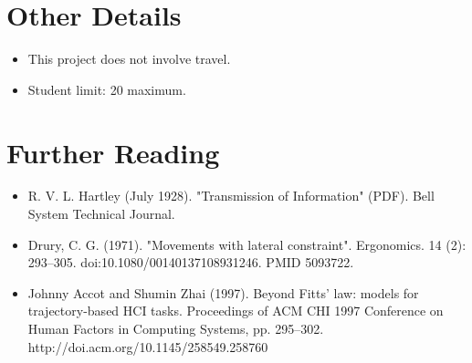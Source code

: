 \documentclass	[a4paper,11pt, hidelinks]{article}
\theoremstyle	{definition}
\begin{document}
\section{Other Details}
\begin{itemize}
  \item This project does not involve travel.
  \item Student limit: 20 maximum.
\end{itemize}

\section{Further Reading}
\begin{itemize}
	\item R. V. L. Hartley (July 1928). "Transmission of Information" (PDF). Bell System Technical Journal.
	\item Drury, C. G. (1971). "Movements with lateral constraint". Ergonomics. 14 (2): 293–305. doi:10.1080/00140137108931246. PMID 5093722.
	\item Johnny Accot and Shumin Zhai (1997). Beyond Fitts' law: models for trajectory-based HCI tasks. Proceedings of ACM CHI 1997 Conference on Human Factors in Computing Systems, pp. 295–302. http://doi.acm.org/10.1145/258549.258760
\end{itemize}



\end{document}
